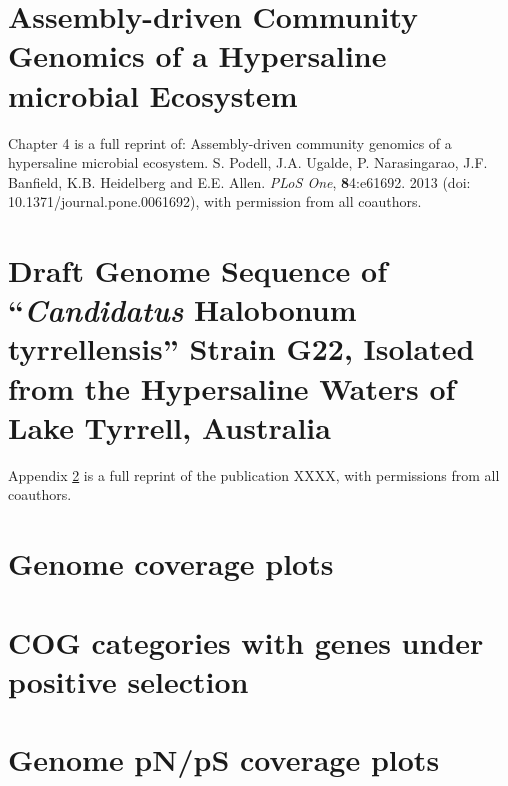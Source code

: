\documentclass[12pt,chapterheads]{ucsd}
\begin{document}
\chapter{Assembly-driven Community Genomics of a Hypersaline microbial Ecosystem}

Chapter 4 is a full reprint of: Assembly-driven community genomics of a hypersaline microbial ecosystem. S. Podell, J.A. Ugalde, P. Narasingarao, J.F. Banfield, K.B. Heidelberg and E.E. Allen. \textit{PLoS One}, \textbf{8}4:e61692. 2013 (doi: 10.1371/journal.pone.0061692), with permission from all coauthors.



%






\appendix

\chapter{Draft Genome Sequence of “\textit{Candidatus} Halobonum tyrrellensis” Strain G22, Isolated from the Hypersaline Waters of Lake Tyrrell, Australia}\label{G22Genome}

Appendix \ref{G22Genome} is a full reprint of the publication XXXX, with permissions from all coauthors.

\chapter{Genome coverage plots}\label{AppendixCoverage}


\chapter{COG categories with genes under positive selection}\label{Appendix_COGselection}


\chapter{Genome pN/pS coverage plots}\label{Appendix_pNpS}


%

\listoftodos


\end{document}
